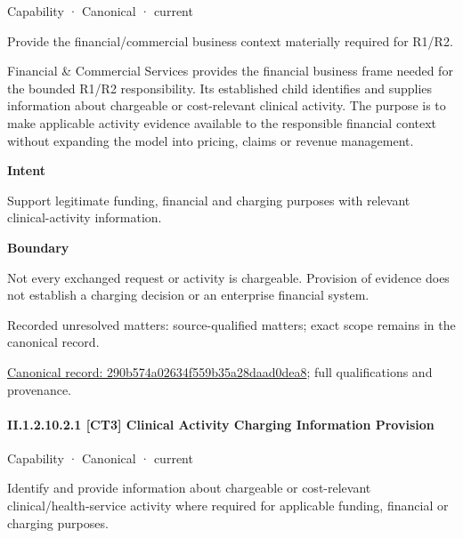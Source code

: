 \label{element:290b574a02634f559b35a28daad0dea8}
{\small Capability · Canonical · current}\par

Provide the financial/commercial business context materially required for R1/R2.



Financial \& Commercial Services provides the financial business frame needed for the bounded R1/R2 responsibility. Its established child identifies and supplies information about chargeable or cost-relevant clinical activity. The purpose is to make applicable activity evidence available to the responsible financial context without expanding the model into pricing, claims or revenue management.



\textbf{Intent}



Support legitimate funding, financial and charging purposes with relevant clinical-activity information.



\textbf{Boundary}



Not every exchanged request or activity is chargeable. Provision of evidence does not establish a charging decision or an enterprise financial system.


{\small Recorded unresolved matters: source-qualified matters; exact scope remains in the canonical record.}\par
{\footnotesize \href{../../../../continuum/strategy/capability/290b574a02634f559b35a28daad0dea8.md}{Canonical record: 290b574a02634f559b35a28daad0dea8}; full qualifications and provenance.}\par
\paragraph*{II.1.2.10.2.1 [CT3] Clinical Activity Charging Information Provision}
\label{navigation:II.1.2.10.2.1}

\label{element:ce9655c00f044ca996c9d4a1222785f5}
{\small Capability · Canonical · current}\par

Identify and provide information about chargeable or cost-relevant clinical/health-service activity where required for applicable funding, financial or charging purposes.



